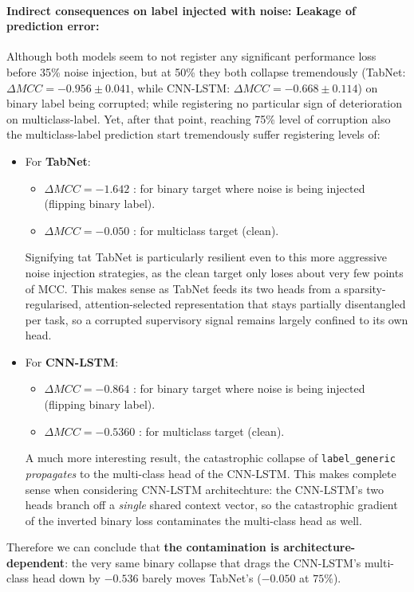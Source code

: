 \documentclass[../main.tex]{subfiles}
\begin{document}
\paragraph{Indirect consequences on label injected with noise: Leakage of prediction error:}
Although both models seem to not register any significant performance loss before 35\% noise injection, but at 50\% they both collapse tremendously (TabNet: $\Delta MCC = -0.956{\pm}0.041$, while CNN-LSTM: $\Delta MCC = -0.668{\pm}0.114$) on binary label being corrupted; while registering no particular sign of deterioration on multiclass-label. Yet, after that point, reaching 75\% level of corruption also the multiclass-label prediction start tremendously suffer registering levels of:
\begin{itemize}
    \item For \textbf{TabNet}:
    \begin{itemize}
        \item $\Delta MCC = -1.642$ : for binary target where noise is being injected (flipping binary label).
        \item $\Delta MCC = -0.050$ : for multiclass target (clean).
    \end{itemize}
    Signifying tat TabNet is particularly resilient even to this more aggressive noise injection strategies, as the clean target only loses about very few points of MCC. This makes sense as TabNet feeds its two heads from a sparsity-regularised, attention-selected representation that stays partially disentangled per task, so a corrupted supervisory signal remains largely confined to its own head.
    
    \item For \textbf{CNN-LSTM}:
    \begin{itemize}
        \item $\Delta MCC = -0.864$ : for binary target where noise is being injected (flipping binary label).
        \item $\Delta MCC = -0.5360$ : for multiclass target (clean).
    \end{itemize}
    A much more interesting result, the catastrophic collapse of \texttt{label\_generic} \emph{propagates} to the multi-class head of the CNN-LSTM. This makes complete sense when considering CNN-LSTM architechture: the CNN-LSTM's two heads branch off a \emph{single} shared context vector, so the catastrophic gradient of the inverted binary loss contaminates the multi-class head as well. 
\end{itemize}
Therefore we can conclude that \textbf{the contamination is architecture-dependent}: the very same binary collapse that drags the CNN-LSTM's multi-class head down by $-0.536$ barely moves TabNet's ($-0.050$ at $75\%$).  
\end{document}
